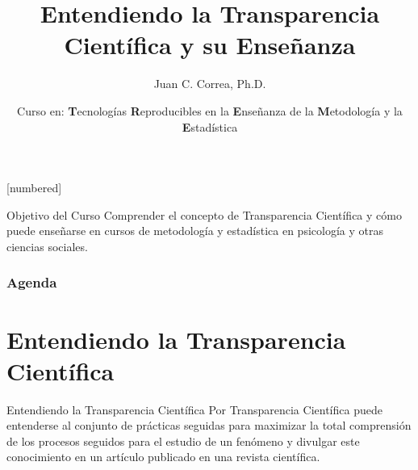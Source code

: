 \documentclass{beamer}
\begin{document}



\author[Juan C. Correa \textcolor{white}{(\url{https://correajc.com}})]{Juan C. Correa, Ph.D.}
\title[Enseñanza de la Transparencia Científica]{Entendiendo la Transparencia Científica y su Enseñanza}
[numbered]
\date[Bogotá, Mayo-2021]{Curso en: \textbf{T}ecnologías \textbf{R}eproducibles en la \textbf{E}nseñanza de la \textbf{M}etodología y la \textbf{E}stadística}


\begin{frame}
	\titlepage
\end{frame}

\begin{frame}
\begin{block}{Objetivo del Curso}
\vspace{0.3cm}
Comprender el concepto de Transparencia Científica y cómo puede enseñarse en cursos de metodología y estadística en psicología y otras ciencias sociales.  
\end{block}
\end{frame}



\begin{frame}
\frametitle{Agenda} 
\tableofcontents
\end{frame}

\section{Entendiendo la Transparencia Científica}
\begin{frame}{Entendiendo la Transparencia Científica}
Por \textcolor{blue!46!green}{Transparencia Científica} puede entenderse al conjunto de prácticas seguidas para maximizar la total comprensión de los procesos seguidos para el estudio de un fenómeno y divulgar este conocimiento en un artículo publicado en una revista científica.
\end{frame}
\end{document}
